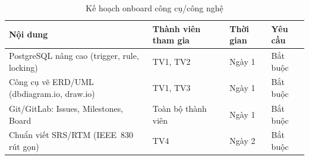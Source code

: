 \begin{table}[htbp]
    \centering
    \small
    \caption{Kế hoạch onboard công cụ/công nghệ}
    \begin{tabular}{|p{4cm}|p{3cm}|p{2.5cm}|p{2.5cm}|}
        \hline
        \textbf{Nội dung} & \textbf{Thành viên tham gia} & \textbf{Thời gian} & \textbf{Yêu cầu} \\
        \hline
        PostgreSQL nâng cao (trigger, rule, locking) & TV1, TV2 & Ngày 1 & Bắt buộc \\
        \hline
        Công cụ vẽ ERD/UML (dbdiagram.io, draw.io) & TV1, TV3 & Ngày 1 & Bắt buộc \\
        \hline
        Git/GitLab: Issues, Milestones, Board & Toàn bộ thành viên & Ngày 1 & Bắt buộc \\
        \hline
        Chuẩn viết SRS/RTM (IEEE~830 rút gọn) & TV4 & Ngày 2 & Bắt buộc \\
        \hline
    \end{tabular}
\end{table}
